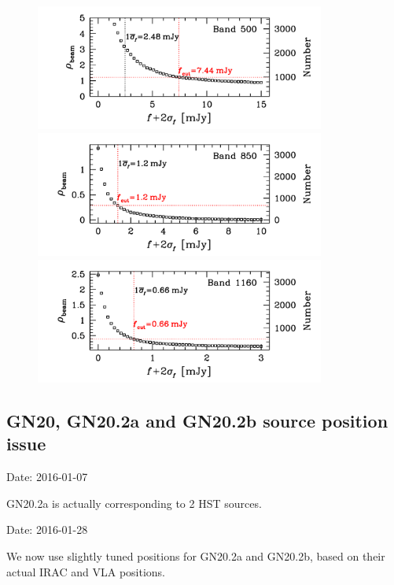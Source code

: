 \documentclass[11pt,a4paper]{article}
\begin{document}
\begin{figure}[H]
	\includegraphics[width=0.85\textwidth]{plot_cutting_flux_500} 
	\includegraphics[width=0.85\textwidth]{plot_cutting_flux_850} 
	\includegraphics[width=0.85\textwidth]{plot_cutting_flux_1160} 
\end{figure}



\subsection{GN20, GN20.2a and GN20.2b source position issue}

\textcolor{green!90!black!60!orange}{Date: 2016-01-07}

GN20.2a is actually corresponding to 2 HST sources. 

\textcolor{green!90!black!60!orange}{Date: 2016-01-28}

We now use slightly tuned positions for GN20.2a and GN20.2b, based on their actual IRAC and VLA positions. 
\end{document}
